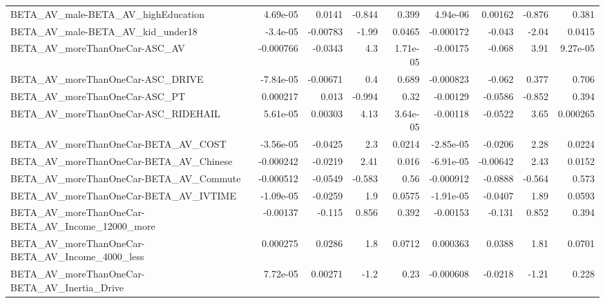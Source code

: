 \begin{tabular}{lrrrrrrrr}
BETA\_AV\_male-BETA\_AV\_highEducation                 &    4.69e-05 &       0.0141 &   -0.844 &    0.399 &   4.94e-06 &     0.00162 &       -0.876 &         0.381 \\
BETA\_AV\_male-BETA\_AV\_kid\_under18                   &    -3.4e-05 &     -0.00783 &    -1.99 &   0.0465 &  -0.000172 &      -0.043 &        -2.04 &        0.0415 \\
BETA\_AV\_moreThanOneCar-ASC\_AV                      &   -0.000766 &      -0.0343 &      4.3 & 1.71e-05 &   -0.00175 &      -0.068 &         3.91 &      9.27e-05 \\
BETA\_AV\_moreThanOneCar-ASC\_DRIVE                   &   -7.84e-05 &     -0.00671 &      0.4 &    0.689 &  -0.000823 &      -0.062 &        0.377 &         0.706 \\
BETA\_AV\_moreThanOneCar-ASC\_PT                      &    0.000217 &        0.013 &   -0.994 &     0.32 &   -0.00129 &     -0.0586 &       -0.852 &         0.394 \\
BETA\_AV\_moreThanOneCar-ASC\_RIDEHAIL                &    5.61e-05 &      0.00303 &     4.13 & 3.64e-05 &   -0.00118 &     -0.0522 &         3.65 &      0.000265 \\
BETA\_AV\_moreThanOneCar-BETA\_AV\_COST                &   -3.56e-05 &      -0.0425 &      2.3 &   0.0214 &  -2.85e-05 &     -0.0206 &         2.28 &        0.0224 \\
BETA\_AV\_moreThanOneCar-BETA\_AV\_Chinese             &   -0.000242 &      -0.0219 &     2.41 &    0.016 &  -6.91e-05 &    -0.00642 &         2.43 &        0.0152 \\
BETA\_AV\_moreThanOneCar-BETA\_AV\_Commute             &   -0.000512 &      -0.0549 &   -0.583 &     0.56 &  -0.000912 &     -0.0888 &       -0.564 &         0.573 \\
BETA\_AV\_moreThanOneCar-BETA\_AV\_IVTIME              &   -1.09e-05 &      -0.0259 &      1.9 &   0.0575 &  -1.91e-05 &     -0.0407 &         1.89 &        0.0593 \\
BETA\_AV\_moreThanOneCar-BETA\_AV\_Income\_12000\_more   &    -0.00137 &       -0.115 &    0.856 &    0.392 &   -0.00153 &      -0.131 &        0.852 &         0.394 \\
BETA\_AV\_moreThanOneCar-BETA\_AV\_Income\_4000\_less    &    0.000275 &       0.0286 &      1.8 &   0.0712 &   0.000363 &      0.0388 &         1.81 &        0.0701 \\
BETA\_AV\_moreThanOneCar-BETA\_AV\_Inertia\_Drive       &    7.72e-05 &      0.00271 &     -1.2 &     0.23 &  -0.000608 &     -0.0218 &        -1.21 &         0.228 \\

\end{tabular}
